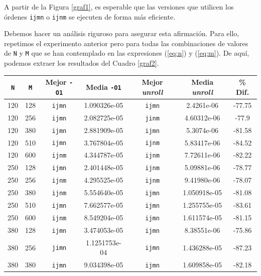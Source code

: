 \documentclass[11pt,a4paper,twoside]{article}
\theoremstyle{definition}
\begin{document}
	A partir de la Figura \ref{graf1}, es esperable que las versiones que utilicen los órdenes \texttt{ijmn} o \texttt{ijnm} se ejecuten de forma más eficiente.
	
	Debemos hacer un análisis riguroso para asegurar esta afirmación. Para ello, repetimos el experimento anterior pero para todas las combinaciones de valores de \texttt{N} y \texttt{M} que se han contemplado en las expresiones (\ref{eq:n}) y (\ref{eq:m}). De aquí, podemos extraer los resultados del Cuadro \ref{graf2}.
	
	\begin{table}[H]
		\centering
		\begin{tabular}{|c|c|c|c|c|c|c|}
			\hline
			\textbf{\texttt{N}} & \textbf{\texttt{M}} & \textbf{Mejor \texttt{-O1}} & \textbf{Media \texttt{-O1}} & \textbf{Mejor \textit{unroll}} & \textbf{Media \textit{unroll}} & \textbf{\% Dif.} \\
			\hline
			120 & 128 & \texttt{ijmn} & 1.090326e-05 & \texttt{ijmn} & 2.4261e-06 & -77.75 \\
			120 & 256 & \texttt{ijmn} & 2.082725e-05 & \texttt{jinm} & 4.60312e-06 & -77.9 \\
			120 & 380 & \texttt{ijmn} & 2.881909e-05 & \texttt{ijmn} & 5.3074e-06 & -81.58 \\
			120 & 510 & \texttt{ijmn} & 3.767804e-05 & \texttt{ijnm} & 5.83417e-06 & -84.52 \\
			120 & 600 & \texttt{ijnm} & 4.344787e-05 & \texttt{ijnm} & 7.72611e-06 & -82.22 \\
			250 & 128 & \texttt{ijmn} & 2.401448e-05 & \texttt{ijnm} & 5.09881e-06 & -78.77 \\
			250 & 256 & \texttt{ijnm} & 4.295525e-05 & \texttt{ijnm} & 9.41980e-06 & -78.07 \\
			250 & 380 & \texttt{ijnm} & 5.554640e-05 & \texttt{ijmn} & 1.050918e-05 & -81.08 \\
			250 & 510 & \texttt{ijmn} & 7.662577e-05 & \texttt{ijmn} & 1.255755e-05 & -83.61 \\
			250 & 600 & \texttt{ijnm} & 8.549204e-05 & \texttt{ijmn} & 1.611574e-05 & -81.15 \\
			380 & 128 & \texttt{ijmn} & 3.474053e-05 & \texttt{ijmn} & 8.38551e-06 & -75.86 \\
			380 & 256 & \texttt{jimn} & 1.1251753e-04 & \texttt{ijmn} & 1.436288e-05 & -87.23 \\
			380 & 380 & \texttt{ijmn} & 9.034398e-05 & \texttt{ijmn} & 1.609858e-05 & -82.18 \\

\end{tabular}
\end{table}
\end{document}
